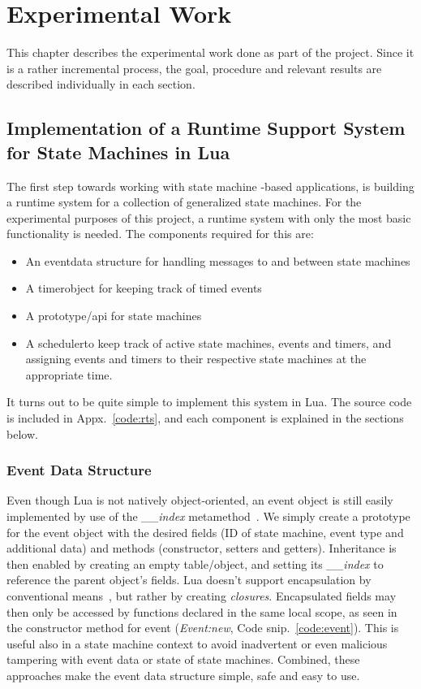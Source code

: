 \chapter{Experimental Work}
\label{ch:experimental_work}
This chapter describes the experimental work done as part of the project. Since it is a rather incremental process, the goal, procedure and relevant results are described individually in each section.

\section{Implementation of a Runtime Support System for State Machines in Lua}
\label{sec:impl_runtime_support}
The first step towards working with state machine -based applications, is building a runtime system for a collection of generalized state machines. For the experimental purposes of this project, a runtime system with only the most basic functionality is needed. The components required for this are:

\begin{itemize}
	\item An \guillemotleft event\guillemotright  data structure for handling messages to and between state machines
	\item A \guillemotleft timer\guillemotright  object for keeping track of timed events
	\item A prototype/\gls{api} for state machines
	\item A \guillemotleft scheduler\guillemotright  to keep track of active state machines, events and timers, and assigning events and timers to their respective state machines at the appropriate time.
\end{itemize}

It turns out to be quite simple to implement this system in Lua. The source code is included in Appx.~\ref{code:rts}, and each component is explained in the sections below.

\subsection{Event Data Structure}
\label{sec:impl_event}
Even though Lua is not natively object-oriented, an event object is still easily implemented by use of the \emph{\_\_index} metamethod~\cite[13.4.1]{book:programming_in_lua_first}. We simply create a prototype for the event object with the desired fields (ID of state machine, event type and additional data) and methods (constructor, setters and getters). Inheritance is then enabled by creating an empty table/object, and setting its \emph{\_\_index} to reference the parent object's fields. Lua doesn't support encapsulation by conventional means~\cite[16.4]{book:programming_in_lua_first}, but rather by creating \emph{closures}. Encapsulated fields may then only be accessed by functions declared in the same local scope, as seen in the constructor method for event (\emph{Event:new}, Code snip.~\ref{code:event}). This is useful also in a state machine context to avoid inadvertent or even malicious tampering with event data or state of state machines. Combined, these approaches make the event data structure simple, safe and easy to use.

